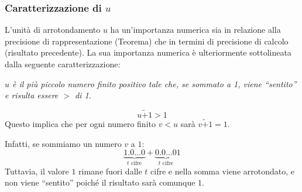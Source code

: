 \documentclass{article}
\begin{document}
\subsubsection{Caratterizzazione di $u$}
L'unità di arrotondamento $u$ ha un'importanza numerica sia in relazione alla precisione
di rappresentazione (Teorema) che in termini di precisione di calcolo (risultato precedente).
La sua importanza numerica è ulteriormente sottolineata dalla seguente
caratterizzazione:

\begin{center}
    \emph{$u$ è il più piccolo numero finito positivo tale che, se sommato a
    1, viene ``sentito'' e risulta essere $>$ di 1.}
\end{center}
$$u\tilde+1>1$$
Questo implica che per ogni numero finito $v<u$ sarà $v\tilde+1=1$.

Infatti, se sommiamo un numero $v$ a $1$:
    $$
    \underbrace{1.0 \ldots 0}_{t \text{ cifre}} + \underbrace{0.0 \ldots 0}_{t
    \text{ cifre}}1
    $$
Tuttavia, il valore $1$ rimane fuori dalle $t$ cifre e nella somma viene
arrotondato, e non viene ``sentito'' poiché il risultato sarà comunque $1$.
\end{document}
